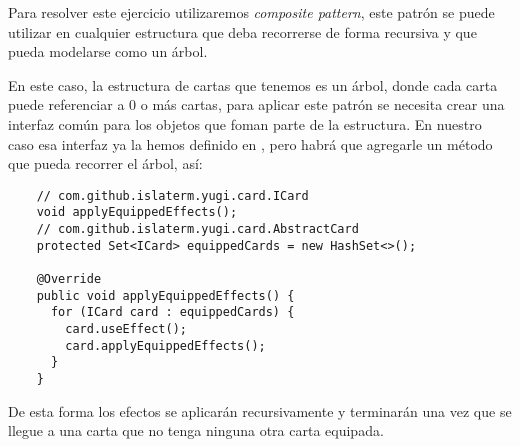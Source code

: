 \begin{Answer}[ref=ex:composite-1]
  Para resolver este ejercicio utilizaremos \textit{composite pattern}, este patrón se 
  puede utilizar en cualquier estructura que deba recorrerse de forma recursiva y que 
  pueda modelarse como un árbol.
  
  En este caso, la estructura de cartas que tenemos es un árbol, donde cada carta puede 
  referenciar a 0 o más cartas, para aplicar este patrón se necesita crear una interfaz 
  común para los objetos que foman parte de la estructura.
  En nuestro caso esa interfaz ya la hemos definido en , pero habrá que 
  agregarle un método que pueda recorrer el árbol, así:

  \begin{verbatim}
    // com.github.islaterm.yugi.card.ICard
    void applyEquippedEffects();
    // com.github.islaterm.yugi.card.AbstractCard
    protected Set<ICard> equippedCards = new HashSet<>();

    @Override
    public void applyEquippedEffects() {
      for (ICard card : equippedCards) {
        card.useEffect();
        card.applyEquippedEffects();
      }
    }
  \end{verbatim}

  De esta forma los efectos se aplicarán recursivamente y terminarán una vez que se llegue
  a una carta que no tenga ninguna otra carta equipada. 
\end{Answer}
%